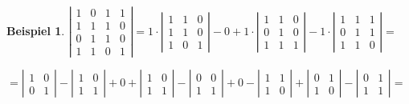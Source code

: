 \documentclass[a4paper,10pt]{report}
\newtheorem{myexample}{Beispiel}
\begin{document}
\begin{myexample}
$ \left | \begin {array}{rrrr} 1 & 0 & 1  & 1\\
                                1 & 1 & 1 & 0\\
                                0 & 1 & 1 & 0\\
                                1 & 1 & 0 & 1 \end{array} \right | =
1\cdot \left | \begin {array}{rrr} 1 & 1 & 0\\
                                    1 & 1 & 0\\
                                    1 & 0 & 1 \end{array} \right |
-0 + 1 \cdot \left | \begin {array}{rrr} 1 & 1 & 0\\
                                     0 & 1 & 0\\
                                     1 & 1 & 1 \end{array} \right |
-1 \cdot \left | \begin {array}{rrr} 1 & 1 & 1\\
                                     0 & 1 & 1\\
                                     1 & 1 & 0 \end{array} \right |
                                     =$

\vspace{0.5cm}

\hspace{0.8cm} $ = \left | \begin {array}{rr} 1 & 0 \\
                             0 & 1 \end{array} \right |
- \left | \begin {array}{rr} 1 & 0 \\
                             1 & 1 \end{array} \right |
+ 0 + \left | \begin {array}{rr} 1 & 0 \\
                                1 & 1 \end{array} \right |
- \left | \begin {array}{rr} 0 & 0 \\
                             1 & 1 \end{array} \right |
+ 0 -\left | \begin {array}{rr} 1 & 1 \\
                                1 & 0 \end{array} \right |
+ \left | \begin {array}{rr} 0 & 1 \\
                             1 & 0 \end{array} \right |
- \left | \begin {array}{rr} 0 & 1 \\
                             1 & 1 \end{array} \right | = $


\end{myexample}
\end{document}
